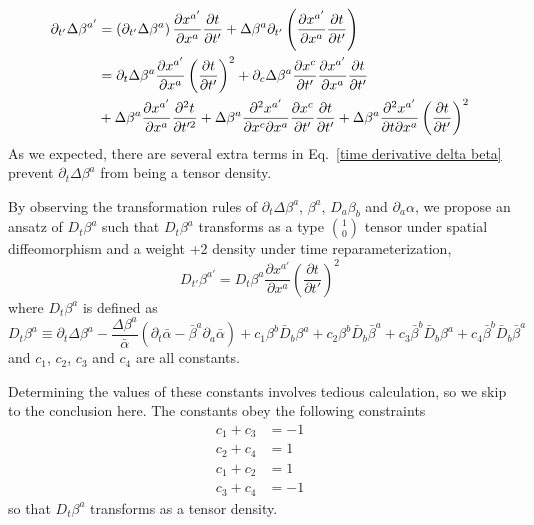 \documentclass[letterpaper,nofootinbib,prd,amsmath,onecolumn]{revtex4-1}
\begin{document}
\begin{align}\label{time derivative delta beta} 
\partial_{t'}\Delta \beta^{a'} & = \left(\partial_{t'}\Delta \beta^{a}\right)\frac{\partial x^{a'}}{\partial x^{a}}\frac{\partial t}{\partial t'} + \Delta \beta^{a}\partial_{t'}\left(\frac{\partial x^{a'}}{\partial x^{a}}\frac{\partial t}{\partial t'}\right)\notag\\
& = \partial_{t}\Delta \beta^{a}\frac{\partial x^{a'}}{\partial x^{a}}\left(\frac{\partial t}{\partial t'}\right)^{2} + \partial_{c}\Delta \beta^{a}\frac{\partial x^{c}}{\partial t'}\frac{\partial x^{a'}}{\partial x^{a}}\frac{\partial t}{\partial t'}\notag\\
& + \Delta \beta^{a}\frac{\partial x^{a'}}{\partial x^{a}}\frac{\partial^{2}t}{\partial t'^{2}} + \Delta \beta^{a}\frac{\partial^{2} x^{a'}}{\partial x^{c}\partial x^{a}}\frac{\partial x^{c}}{\partial t'}\frac{\partial t}{\partial t'} + \Delta \beta^{a}\frac{\partial^{2}x^{a'}}{\partial t\partial x^{a}}\left(\frac{\partial t}{\partial t'}\right)^{2}
\end{align}
As we expected, there are several extra terms in Eq.~\ref{time derivative delta beta} prevent $\partial_{t}\Delta\beta^{a}$ from being a tensor density. 

By observing the transformation rules of $\partial_{t}\Delta\beta^{a}$, $\beta^{a}$, $D_{a}\beta_{b}$ and $\partial_{a}\alpha$, we propose an ansatz of $D_{t}\beta^{a}$ such that $D_{t}\beta^{a}$ transforms as a type $1 \choose 0$ tensor under spatial diffeomorphism and a weight +2 density under time reparameterization, 
\begin{equation}
D_{t'}\beta^{a'} = D_{t}\beta^{a}\frac{\partial x^{a'}}{\partial x^{a}}\left(\frac{\partial t}{\partial t'}\right)^{2}
\end{equation}
where $D_{t}\beta^{a}$ is defined as
\begin{equation}
D_{t}\beta^{a} \equiv \partial_{t}\Delta \beta^{a} - \frac{\Delta \beta^{a}}{{\bar \alpha}}(\partial_{t}{\bar \alpha} - {\bar \beta}^{a}\partial_{a}{\bar \alpha}) + c_{1}\beta^{b}{\bar D}_{b}\beta^{a} + c_{2}\beta^{b}{\bar D}_{b}{\bar \beta}^{a} + c_{3}{\bar \beta}^{b}{\bar D}_{b}\beta^{a} + c_{4}{\bar \beta}^{b}{\bar D}_{b}{\bar \beta}^{a}
\end{equation}
and $c_{1}$, $c_{2}$, $c_{3}$ and $c_{4}$ are all constants. 

Determining the values of these constants involves tedious calculation, so we skip to the conclusion here. The constants obey the following constraints
\begin{align*}
c_{1} + c_{3} & = -1\\
c_{2} + c_{4} & = 1\\
c_{1} + c_{2} & = 1\\
c_{3} + c_{4} & = -1 
\end{align*}
so that $D_{t} \beta^{a}$ transforms as a tensor density. 
\end{document}
